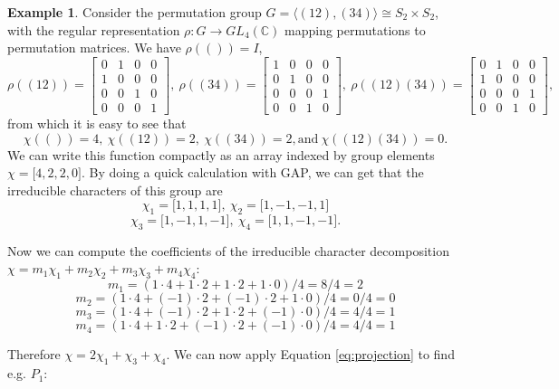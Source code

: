\documentclass[11pt]{article} %
\theoremstyle{definition}
\newtheorem*{example}{Example}
\theoremstyle{remark}
\begin{document}
\begin{example}
Consider the permutation group $G = \langle (12), (34) \rangle \cong S_2 \times S_2 $, with the regular representation $\rho : G \rightarrow GL_4(\mathbb{C})$ mapping permutations to permutation matrices. We have $\rho(()) = I$, 
\[
\rho((12)) =
	\begin{bmatrix}
	0 & 1 & 0 & 0 \\
	1 & 0 & 0 & 0 \\
	0 & 0 & 1 & 0 \\
	0 & 0 & 0 & 1
	\end{bmatrix}
,\
\rho((34)) =
	\begin{bmatrix}
	1 & 0 & 0 & 0 \\
	0 & 1 & 0 & 0 \\
	0 & 0 & 0 & 1 \\
	0 & 0 & 1 & 0
	\end{bmatrix}
,\
\rho((12)(34)) =
	\begin{bmatrix}
	0 & 1 & 0 & 0 \\
	1 & 0 & 0 & 0 \\
	0 & 0 & 0 & 1 \\
	0 & 0 & 1 & 0
	\end{bmatrix},
\]
from which it is easy to see that
\[
\chi(()) = 4,\ \chi((12)) = 2,\ \chi((34)) = 2, \textrm{and}\ \chi((12)(34)) = 0.
\]
We can write this function compactly as an array indexed by group elements $\chi = \lbrack 4, 2, 2, 0 \rbrack$. By doing a quick calculation with GAP, we can get that the irreducible characters of this group are
\[
\chi_1 = \lbrack 1, 1, 1, 1 \rbrack, \
\chi_2 = \lbrack 1, -1, -1, 1 \rbrack
\]
\[
\chi_3 = \lbrack 1, -1, 1, -1 \rbrack, \
\chi_4 = \lbrack 1, 1, -1, -1 \rbrack.
\]

Now we can compute the coefficients of the irreducible character decomposition $\chi = m_1\chi_1 + m_2\chi_2 + m_3\chi_3 + m_4\chi_4$:
\[ m_1 = (1 \cdot 4 + 1 \cdot 2 + 1 \cdot 2 + 1 \cdot 0)/4 = 8/4 = 2 \]
\[ m_2 = (1 \cdot 4 + (-1) \cdot 2 + (-1) \cdot 2 + 1 \cdot 0)/4 = 0/4 = 0 \]
\[ m_3 = (1 \cdot 4 + (-1) \cdot 2 + 1 \cdot 2 + (-1) \cdot 0)/4 = 4/4 = 1 \]
\[ m_4 = (1 \cdot 4 + 1 \cdot 2 + (-1) \cdot 2 + (-1) \cdot 0)/4 = 4/4 = 1 \]

Therefore $\chi = 2\chi_1 + \chi_3 + \chi_4$. We can now apply Equation \eqref{eq:projection} to find e.g. $P_1$:


\end{example}
\end{document}
